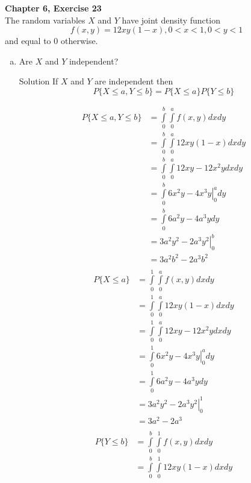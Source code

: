 \documentclass{article}
\begin{document}
\begin{spacing}{1.1}
\newpage
\begin{homeworkProblem}
  {\bf Chapter 6, Exercise 23}\\
  The random variables $X$ and $Y$ have joint density function
  \[f( x, y) = 12 x y (1 - x), 0 < x < 1, 0 < y < 1\]
  and equal to 0 otherwise.
  \begin{enumerate}[(a)]
    \item Are $X$ and $Y$ independent?
      \begin{homeworkSection}{Solution}
          If $X$ and $Y$ are independent then
          \[P\{ X \le a, Y \le b\} = P\{ X \le a \} P\{ Y \le b\}\]

        \begin{align*}
          P\{ X \le a, Y \le b\} &= \int\limits_0^b \int\limits_0^a f( x, y) dx dy\\
          &= \int\limits_0^b \int\limits_0^a 12 x y (1 - x) dx dy\\
          &= \int\limits_0^b \int\limits_0^a 12 x y - 12 x^2 y dx dy\\
          &= \int\limits_0^b \left.6 x^2 y - 4 x^3 y\right|_0^a dy\\
          &= \int\limits_0^b 6 a^2 y - 4 a^3 y dy\\
          &= \left.3 a^2 y^2 - 2 a^3 y^2\right|_0^b\\
          &= 3 a^2 b^2 - 2 a^3 b^2\\
        \end{align*}
        \begin{align*}
          P\{ X \le a\} &= \int\limits_0^1 \int\limits_0^a f( x, y) dx dy\\
          &= \int\limits_0^1 \int\limits_0^a 12 x y (1 - x) dx dy\\
          &= \int\limits_0^1 \int\limits_0^a 12 x y - 12 x^2 y dx dy\\
          &= \int\limits_0^1 \left.6 x^2 y - 4 x^3 y\right|_0^a dy\\
          &= \int\limits_0^1 6 a^2 y - 4 a^3 y dy\\
          &= \left.3 a^2 y^2 - 2 a^3 y^2\right|_0^1\\
          &= 3 a^2 - 2 a^3\\
        \end{align*}
        \begin{align*}
          P\{ Y \le b\} &= \int\limits_0^b \int\limits_0^1 f( x, y) dx dy\\
          &= \int\limits_0^b \int\limits_0^1 12 x y (1 - x) dx dy\\

\end{align*}
\end{homeworkSection}
\end{enumerate}
\end{homeworkProblem}
\end{spacing}
\end{document}
